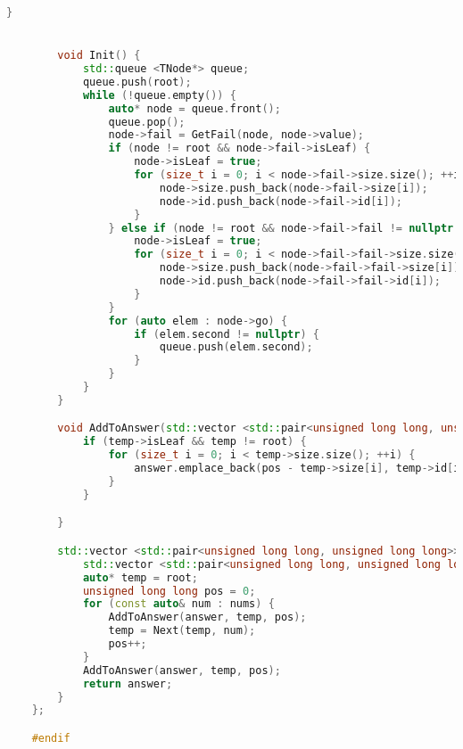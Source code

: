 \begin{lstlisting}[language=C++]
        }


        void Init() {
            std::queue <TNode*> queue;
            queue.push(root);
            while (!queue.empty()) {
                auto* node = queue.front();
                queue.pop();
                node->fail = GetFail(node, node->value);
                if (node != root && node->fail->isLeaf) {
                    node->isLeaf = true;
                    for (size_t i = 0; i < node->fail->size.size(); ++i) {
                        node->size.push_back(node->fail->size[i]);
                        node->id.push_back(node->fail->id[i]);
                    }
                } else if (node != root && node->fail->fail != nullptr && node->fail->fail->isLeaf) {
                    node->isLeaf = true;
                    for (size_t i = 0; i < node->fail->fail->size.size(); ++i) {
                        node->size.push_back(node->fail->fail->size[i]);
                        node->id.push_back(node->fail->fail->id[i]);
                    }
                }
                for (auto elem : node->go) {
                    if (elem.second != nullptr) {
                        queue.push(elem.second);
                    }
                }
            }
        }

        void AddToAnswer(std::vector <std::pair<unsigned long long, unsigned long long>>& answer, TNode* temp, unsigned long long pos) {
            if (temp->isLeaf && temp != root) {
                for (size_t i = 0; i < temp->size.size(); ++i) {
                    answer.emplace_back(pos - temp->size[i], temp->id[i]);
                }
            }

        }

        std::vector <std::pair<unsigned long long, unsigned long long>> FindPosPatterns(const std::vector<unsigned long long >& nums) {
            std::vector <std::pair<unsigned long long, unsigned long long>> answer;
            auto* temp = root;
            unsigned long long pos = 0;
            for (const auto& num : nums) {
                AddToAnswer(answer, temp, pos);
                temp = Next(temp, num);
                pos++;
            }
            AddToAnswer(answer, temp, pos);
            return answer;
        }
    };

    #endif
\end{lstlisting}


